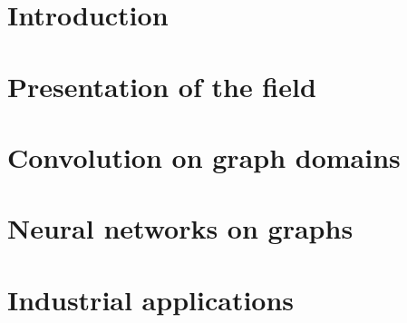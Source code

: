 \documentclass[12pt]{book}
\begin{document}

%
%


%
%

\dominitoc
\tableofcontents
\adjustmtc

%
%

\chapter*{Introduction}
\label{chp:int}
\todo{}
%

%
%

\chapter{Presentation of the field}
\vfill\minitoc\newpage
\newpage

\newpage
\newpage
\newpage

%
%
\chapter{Convolution on graph domains}
\vfill\minitoc\newpage
\newpage

\newpage
\newpage
\newpage
\newpage

%
%

\chapter{Neural networks on graphs}
\vfill\minitoc\newpage
\newpage


\newpage
\newpage
\newpage

%
%

\chapter{Industrial applications}
\todo{}
\vfill\minitoc\newpage
\end{document}
